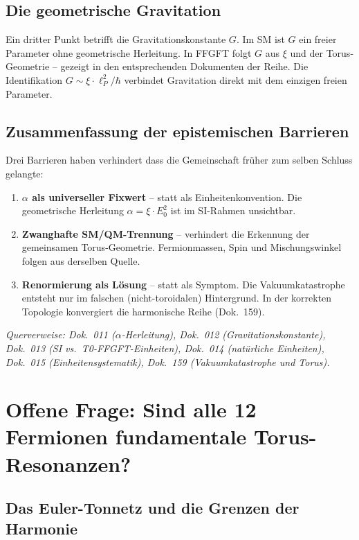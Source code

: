 \subsection{Die geometrische Gravitation}

Ein dritter Punkt betrifft die Gravitationskonstante $G$.
Im SM ist $G$ ein freier Parameter ohne geometrische Herleitung.
In FFGFT folgt $G$ aus $\xi$ und der Torus-Geometrie -- gezeigt
in den entsprechenden Dokumenten der Reihe. Die Identifikation
$G \sim \xi \cdot \ell_P^2 / \hbar$ verbindet Gravitation direkt
mit dem einzigen freien Parameter.

\subsection{Zusammenfassung der epistemischen Barrieren}

Drei Barrieren haben verhindert dass die Gemeinschaft früher
zum selben Schluss gelangte:

\begin{enumerate}
    \item \textbf{$\alpha$ als universeller Fixwert} -- statt als
          Einheitenkonvention. Die geometrische Herleitung
          $\alpha = \xi \cdot E_0^2$ ist im SI-Rahmen unsichtbar.

    \item \textbf{Zwanghafte SM/QM-Trennung} -- verhindert die
          Erkennung der gemeinsamen Torus-Geometrie. Fermionmassen,
          Spin und Mischungswinkel folgen aus derselben Quelle.

    \item \textbf{Renormierung als Lösung} -- statt als Symptom.
          Die Vakuumkatastrophe entsteht nur im falschen
          (nicht-toroidalen) Hintergrund. In der korrekten
          Topologie konvergiert die harmonische Reihe (Dok.~159).
\end{enumerate}

\textit{Querverweise: Dok.~011 ($\alpha$-Herleitung), Dok.~012
(Gravitationskonstante), Dok.~013 (SI vs.\ T0-FFGFT-Einheiten),
Dok.~014 (natürliche Einheiten), Dok.~015 (Einheitensystematik),
Dok.~159 (Vakuumkatastrophe und Torus).}


\section{Offene Frage: Sind alle 12 Fermionen fundamentale Torus-Resonanzen?}

\subsection{Das Euler-Tonnetz und die Grenzen der Harmonie}

